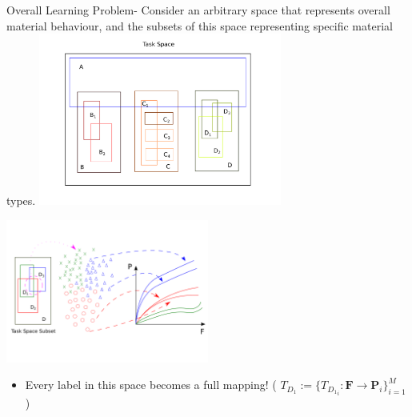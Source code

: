 \begin{frame}{Overall Learning Problem-}
{
  \color{Pink} Consider an arbitrary space that represents overall material behaviour, and the subsets of this space representing specific material types.
  \centering
  \includegraphics[width=0.6\textwidth]{Figures/problem/tasks}
}
{
  \centering
  \includegraphics[width=0.5\textwidth]{Figures/problem/tasks_example}

  \begin{itemize}
  \item \color{Pink} Every label in this space becomes a full mapping! ( $T_{D_1}:=\{T_{{D_1}_i}:\mathbf{F}\to\mathbf{P}_i\}_{i=1}^M$)
  \end{itemize}
}
\end{frame}


